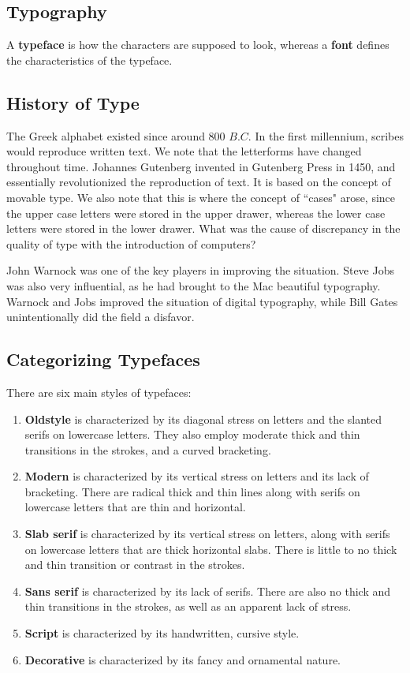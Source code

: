 \documentclass[11pt]{article}
\theoremstyle{plain} %
\theoremstyle{definition}
\theoremstyle{example}
\theoremstyle{remark}
\begin{document}
\subsection{Typography}

A \textbf{typeface} is how the characters are supposed to look, whereas a \textbf{font} defines the characteristics of the typeface.

\subsection{History of Type}

The Greek alphabet existed since around 800 $B.C.$ In the first millennium, scribes would reproduce written text. We note that the letterforms have changed throughout time. Johannes Gutenberg invented in Gutenberg Press in 1450, and essentially revolutionized the reproduction of text. It is based on the concept of movable type. We also note that this is where the concept of ``cases" arose, since the upper case letters were stored in the upper drawer, whereas the lower case letters were stored in the lower drawer. What was the cause of discrepancy in the quality of type with the introduction of computers? 

John Warnock was one of the key players in improving the situation. Steve Jobs was also very influential, as he had brought to the Mac beautiful typography. Warnock and Jobs improved the situation of digital typography, while Bill Gates unintentionally did the field a disfavor.

\subsection{Categorizing Typefaces}

There are six main styles of typefaces:

\begin{enumerate}
	\item \textbf{Oldstyle} is characterized by its diagonal stress on letters and the slanted serifs on lowercase letters. They also employ moderate thick and thin transitions in the strokes, and a curved bracketing.
	\item \textbf{Modern} is characterized by its vertical stress on letters and its lack of bracketing. There are radical thick and thin lines along with serifs on lowercase letters that are thin and horizontal. 
	\item \textbf{Slab serif} is characterized by its vertical stress on letters, along with serifs on lowercase letters that are thick horizontal slabs. There is little to no thick and thin transition or contrast in the strokes. 
	\item \textbf{Sans serif} is characterized by its lack of serifs. There are also no thick and thin transitions in the strokes, as well as an apparent lack of stress. 
	\item \textbf{Script } is characterized by its handwritten, cursive style.
	\item \textbf{Decorative} is characterized by its fancy and ornamental nature. 
\end{enumerate}
\end{document}
